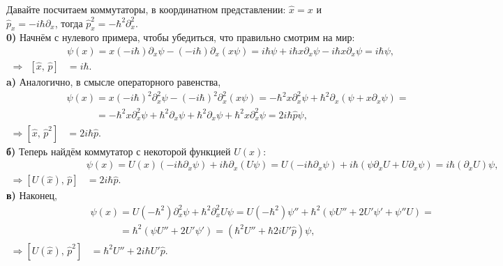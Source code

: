 Давайте посчитаем коммутаторы, в координатном представлении: $\hat{x} = x$ и $\hat{p}_x = - i \hbar \partial_x$, тогда $\hat{p}_x^2 = - \hbar^2 \partial_x^{2}$. 
\\
\textbf{0)} Начнём с нулевого примера, чтобы убедиться, что правильно смотрим на мир:
\begin{align*}
    [\hat{x},\, \hat{p}] &\psi(x) = 
    x (-i \hbar) \partial_x \psi - (-i \hbar) \partial_x (x \psi) = i \hbar \psi + i \hbar x \partial_x \psi - i \hbar x \partial_x \psi = i \hbar \psi,  \\ 
    \Rightarrow \ \ [\hat{x},\, \hat{p}] &= i \hbar.
\end{align*}
\textbf{a)} Аналогично, в смысле операторного равенства,
\begin{align*}
    [\hat{x},\, \hat{p}^2] &\psi(x) 
    = 
    x (-i \hbar)^2 \partial_x^2 \psi - (-i \hbar)^2 \partial_x^2 (x \psi) 
    = 
    - \hbar^2 x \partial_x^2 \psi + \hbar^2 \partial_x (\psi + x \partial_x \psi) 
    = \\ &\phantom{\psi(x)}= 
    - \hbar^2 x \partial_x^2 \psi + \hbar^2 \partial_x \psi + \hbar^2 \partial_x \psi + \hbar^2 x \partial_x^2 \psi = 2 i \hbar \hat{p} \psi,
    \\ \Rightarrow [\hat{x},\, \hat{p}^2] &= 2 i \hbar \hat{p}.
\end{align*}
\textbf{б)} Теперь найдём коммутатор с некоторой функцией $U(x)$:
\begin{align*}
    [U(\hat{x}),\, \hat{p}]&\psi(x) 
    = 
    U(x) (- i \hbar \partial_x \psi) + i \hbar \partial_x (U \psi) 
    = 
    U (- i \hbar \partial_x \psi) + i \hbar  (\psi \partial_x U + U \partial_x \psi)
    = 
    i \hbar (\partial_x U) \psi,
    \\ \Rightarrow [U(\hat{x}),\, \hat{p}] &= 2 i \hbar \hat{p}.
\end{align*}
\textbf{в)} Наконец, 
\begin{align*}
    [U(\hat{x}),\, \hat{p}^2]&\psi(x) 
    = 
    U (-\hbar^2) \partial_x^2 \psi + \hbar^2 \partial_x^2 U \psi
    =
    U (- \hbar^2) \psi'' + \hbar^2 (\psi U'' + 2 U' \psi' + \psi'' U) 
    = \\ &\phantom{\psi(x)}= 
    \hbar^2 (\psi U'' + 2 U' \psi') 
    =
    (\hbar^2 U'' + \hbar 2i U' \hat{p} )\psi,
    \\ \Rightarrow [U(\hat{x}),\, \hat{p}^2] &= \hbar^2 U'' + 2 i \hbar U' \hat{p}.
\end{align*}